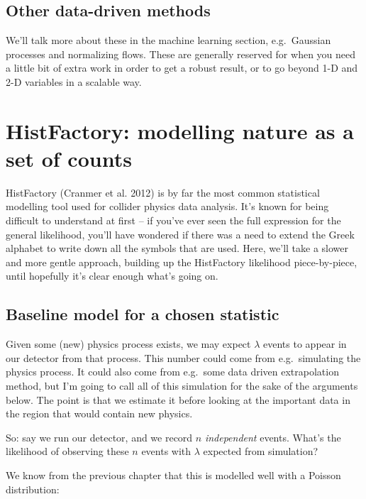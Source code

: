 \documentclass[
  11pt,
  numbers=noendperiod]{book}
\begin{document}
\hypertarget{other-data-driven-methods}{%
\subsection{Other data-driven methods}\label{other-data-driven-methods}}

We'll talk more about these in the machine learning section,
e.g.~Gaussian processes and normalizing flows. These are generally
reserved for when you need a little bit of extra work in order to get a
robust result, or to go beyond 1-D and 2-D variables in a scalable way.

\hypertarget{sec-hifa}{%
\section{HistFactory: modelling nature as a set of
counts}\label{sec-hifa}}

HistFactory (Cranmer et al. 2012) is by far the most common statistical
modelling tool used for collider physics data analysis. It's known for
being difficult to understand at first -- if you've ever seen the full
expression for the general likelihood, you'll have wondered if there was
a need to extend the Greek alphabet to write down all the symbols that
are used. Here, we'll take a slower and more gentle approach, building
up the HistFactory likelihood piece-by-piece, until hopefully it's clear
enough what's going on.

\hypertarget{baseline-model-for-a-chosen-statistic}{%
\subsection{Baseline model for a chosen
statistic}\label{baseline-model-for-a-chosen-statistic}}

Given some (new) physics process exists, we may expect \(\lambda\)
events to appear in our detector from that process. This number could
come from e.g.~simulating the physics process. It could also come from
e.g.~some data driven extrapolation method, but I'm going to call all of
this simulation for the sake of the arguments below. The point is that
we estimate it before looking at the important data in the region that
would contain new physics.

So: say we run our detector, and we record \(n\) \emph{independent}
events. What's the likelihood of observing these \(n\) events with
\(\lambda\) expected from simulation?

We know from the previous chapter that this is modelled well with a
Poisson distribution:
\end{document}
